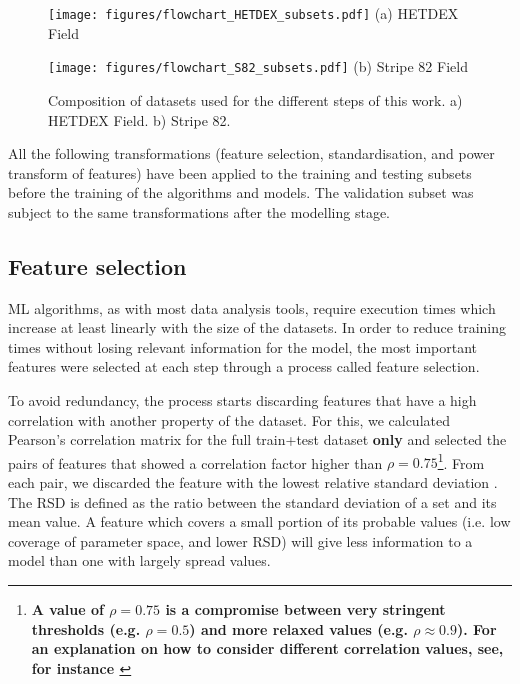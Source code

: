 \documentclass{aa}
\begin{document}
\begin{figure}
  \centering
  \begin{minipage}{0.29\textwidth}
    \centering
    \texttt{[image: figures/flowchart\_HETDEX\_subsets.pdf]}\hfill\break
    {(a) HETDEX Field}
  \end{minipage}
  \hfill
  \begin{minipage}{0.19\textwidth}
    \centering
    \texttt{[image: figures/flowchart\_S82\_subsets.pdf]}
    \vspace{4.5cm}\hfill\break
    {(b) Stripe 82 Field}
  \end{minipage}
  \caption{Composition of datasets used for the different steps of this work. a) HETDEX Field. b) Stripe 82.}
  \label{fig:dataset_sizes}
\end{figure}

All the following transformations (feature selection, standardisation, and power transform of features) have been applied to the training and testing subsets before the training of the algorithms and models. 
The validation subset was subject to the same transformations after the modelling stage.


\subsection{Feature selection}\label{sec:feat_selection}

ML algorithms, as with most data analysis tools, require execution times which increase at least linearly with the size of the datasets. In order to reduce training times without losing relevant information for the model, the most important features were selected at each step through a process called feature selection. 

To avoid redundancy, the process starts discarding features that have a high correlation with another property of the dataset.
For this, we calculated Pearson's correlation matrix for the full train+test dataset \textbf{only} and selected the pairs of features that showed a correlation factor higher than $\rho = 0.75$\footnote{\textbf{A value of $\rho = 0.75$ is a compromise between very stringent thresholds (e.g. $\rho = 0.5$) and more relaxed values (e.g. $\rho \approx 0.9$). For an explanation on how to consider different correlation values, see, for instance \citet{Ratner2009}}}. From each pair, we discarded the feature with the lowest relative standard deviation \citep[RSD;][]{johnson1964statistics}. The RSD is defined as the ratio between the standard deviation of a set and its mean value. A feature which covers a small portion of its probable values (i.e. low coverage of parameter space, and lower RSD) will give less information to a model than one with largely spread values.
\end{document}
